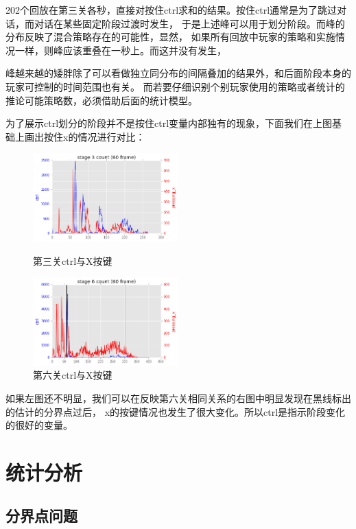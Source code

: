 \documentclass[UTF8]{ctexart}
\begin{document}
202个回放在第三关各秒，直接对按住ctrl求和的结果。按住ctrl通常是为了跳过对话，而对话在某些固定阶段过渡时发生，
于是上述峰可以用于划分阶段。而峰的分布反映了混合策略存在的可能性，显然，
如果所有回放中玩家的策略和实施情况一样，则峰应该重叠在一秒上。而这并没有发生，

峰越来越的矮胖除了可以看做独立同分布的间隔叠加的结果外，和后面阶段本身的玩家可控制的时间范围也有关。
而若要仔细识别个别玩家使用的策略或者统计的推论可能策略数，必须借助后面的统计模型。

为了展示ctrl划分的阶段并不是按住ctrl变量内部独有的现象，下面我们在上图基础上画出按住x的情况进行对比：

\begin{figure}[H]
\begin{minipage}[t]{0.5\linewidth}
\centering
\includegraphics[width=2.2in]{images/sumCtrlX.png}
\caption{第三关ctrl与X按键}
\end{minipage}%
\begin{minipage}[t]{0.5\linewidth}
\centering
\includegraphics[width=2.2in]{images/sumCtrlX2.png}
\caption{第六关ctrl与X按键}
\end{minipage}
\end{figure}

如果左图还不明显，我们可以在反映第六关相同关系的右图中明显发现在黑线标出的估计的分界点过后，
x的按键情况也发生了很大变化。所以ctrl是指示阶段变化的很好的变量。

\section{统计分析}


\subsection{分界点问题}
\end{document}

